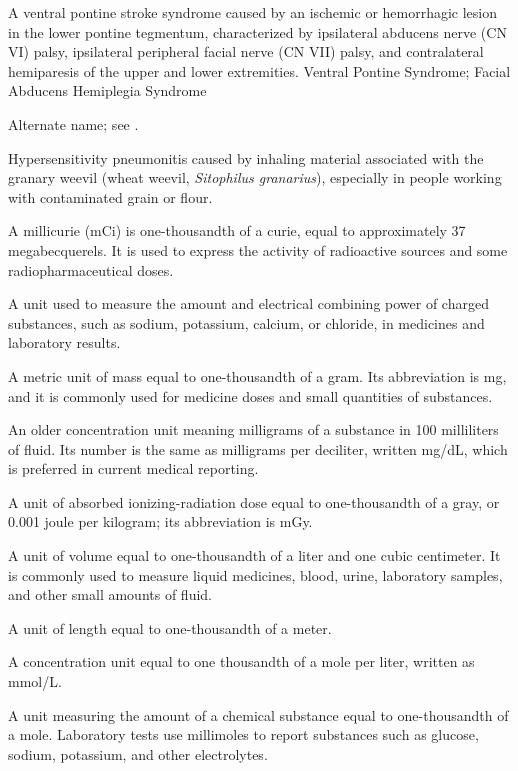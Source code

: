  A ventral pontine stroke syndrome caused by an ischemic or hemorrhagic lesion in the lower pontine tegmentum, characterized by ipsilateral abducens nerve (CN VI) palsy, ipsilateral peripheral facial nerve (CN VII) palsy, and contralateral hemiparesis of the upper and lower extremities.
\synonyms
Ventral Pontine Syndrome; Facial Abducens Hemiplegia Syndrome

 Alternate name; see .

 Hypersensitivity pneumonitis caused by inhaling material associated with the granary weevil (wheat weevil, \textit{Sitophilus granarius}), especially in people working with contaminated grain or flour.

 A millicurie (mCi) is one-thousandth of a curie, equal to approximately 37 megabecquerels. It is used to express the activity of radioactive sources and some radiopharmaceutical doses.

 A unit used to measure the amount and electrical combining power of charged substances, such as sodium, potassium, calcium, or chloride, in medicines and laboratory results.

 A metric unit of mass equal to one-thousandth of a gram. Its abbreviation is mg, and it is commonly used for medicine doses and small quantities of substances.

 An older concentration unit meaning milligrams of a substance in 100 milliliters of fluid. Its number is the same as milligrams per deciliter, written mg/dL, which is preferred in current medical reporting.

 A unit of absorbed ionizing-radiation dose equal to one-thousandth of a gray, or 0.001 joule per kilogram; its abbreviation is mGy.

 A unit of volume equal to one-thousandth of a liter and one cubic centimeter. It is commonly used to measure liquid medicines, blood, urine, laboratory samples, and other small amounts of fluid.

 A unit of length equal to one-thousandth of a meter.

 A concentration unit equal to one thousandth of a mole per liter, written as mmol/L.

 A unit measuring the amount of a chemical substance equal to one-thousandth of a mole. Laboratory tests use millimoles to report substances such as glucose, sodium, potassium, and other electrolytes.


